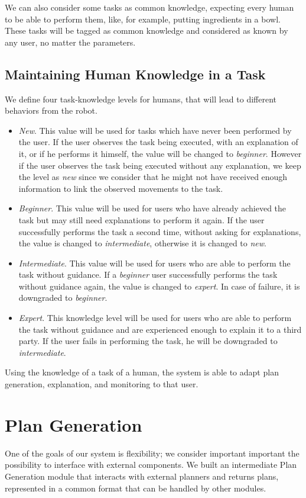 We can also consider some tasks as common knowledge, expecting every human to be able to perform them, like, for example, putting ingredients in a bowl. These tasks will be tagged as common knowledge and considered as known by any user, no matter the parameters. 

\subsection{Maintaining Human Knowledge in a Task}
We define four task-knowledge levels for humans, that will lead to different behaviors from the robot.

\begin{itemize}
\item \textit{New}. This value will be used for tasks which have never been performed by the user. If the user observes the task being executed, with an explanation of it, or if he performs it himself, the value will be changed to \textit{beginner}. However if the user observes the task being executed without any explanation, we keep the level as \textit{new} since we consider that he might not have received enough information to link the observed movements to the task.
\item \textit{Beginner}. This value will be used for users who have already achieved the task but may still need explanations to perform it again. If the user successfully performs the task a second time, without asking for explanations, the value is changed to \textit{intermediate}, otherwise it is changed to \textit{new}.
\item \textit{Intermediate}. This value will be used for users who are able to perform the task without guidance. If a \textit{beginner} user successfully performs the task without guidance again, the value is changed to \textit{expert}. In case of failure, it is downgraded to \textit{beginner}.
\item \textit{Expert}. This knowledge level will be used for users who are able to perform the task without guidance and are experienced enough to explain it to a third party. If the user fails in performing the task, he will be downgraded to \textit{intermediate}.
\end{itemize}

Using the knowledge of a task of a human, the system is able to adapt plan generation, explanation, and monitoring to that user.

\section{Plan Generation}
\label{sec:plan_management-plan_generation}
One of the goals of our system is flexibility; we consider important important the possibility to interface with external components. We built an intermediate Plan Generation module that interacts with external planners and returns plans, represented in a common format that can be handled by other modules. 

